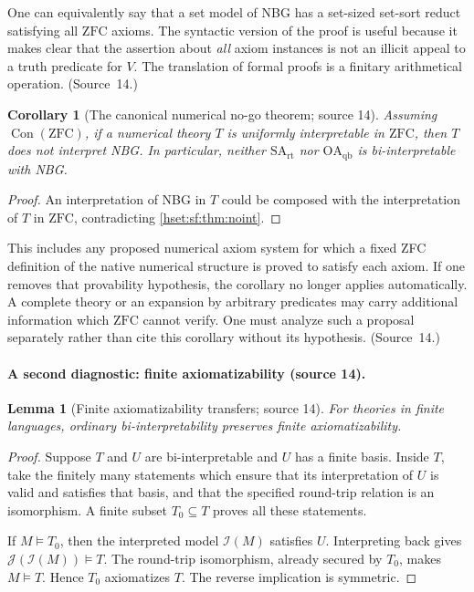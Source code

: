 \documentclass[11pt,letterpaper]{article}
\newtheorem{lemma}[lemma]{Lemma}\aliascntresetthe{lemma}
\newtheorem{corollary}[corollary]{Corollary}\aliascntresetthe{corollary}
\theoremstyle{definition}
\theoremstyle{remark}
\newcommand{\I}{\mathcal I}
\newcommand{\J}{\mathcal J}
\newcommand{\ZFC}{\mathrm{ZFC}}
\newcommand{\Con}{\operatorname{Con}}
\newcommand{\SArt}{\mathrm{SA}_{\mathrm{rt}}}
\newcommand{\OAqb}{\mathrm{OA}_{\mathrm{qb}}}
\begin{document}
One can equivalently say that a set model of NBG has a set-sized set-sort reduct
satisfying all $\ZFC$ axioms. The syntactic version of the proof is useful because
it makes clear that the assertion about \emph{all} axiom instances is not an illicit
appeal to a truth predicate for $V$. The translation of formal proofs is a
finitary arithmetical operation. (Source~14.)

\begin{corollary}[The canonical numerical no-go theorem; source 14]\label{hset:sf:cor:numericalnoint}
Assuming $\Con(\ZFC)$, if a numerical theory $T$ is uniformly interpretable in
$\ZFC$, then $T$ does not interpret NBG. In particular, neither $\SArt$ nor
$\OAqb$ is bi-interpretable with NBG.
\end{corollary}
\begin{proof}
An interpretation of NBG in $T$ could be composed with the interpretation of $T$ in
$\ZFC$, contradicting \cref{hset:sf:thm:noint}.
\end{proof}

This includes any proposed numerical axiom system for which a fixed ZFC definition
of the native numerical structure is proved to satisfy each axiom. If one removes
that provability hypothesis, the corollary no longer applies automatically. A
complete theory or an expansion by arbitrary predicates may carry additional
information which $\ZFC$ cannot verify. One must analyze such a proposal
separately rather than cite this corollary without its hypothesis. (Source~14.)

\paragraph{A second diagnostic: finite axiomatizability (source 14).}

\begin{lemma}[Finite axiomatizability transfers; source 14]\label{hset:sf:lem:finite}
For theories in finite languages, ordinary bi-interpretability preserves finite
axiomatizability.
\end{lemma}
\begin{proof}
Suppose $T$ and $U$ are bi-interpretable and $U$ has a finite basis. Inside $T$,
take the finitely many statements which ensure that its interpretation of $U$ is
valid and satisfies that basis, and that the specified round-trip relation is an
isomorphism. A finite subset $T_0\subseteq T$ proves all these statements.

If $M\models T_0$, then the interpreted model $\I(M)$ satisfies $U$. Interpreting
back gives $\J(\I(M))\models T$. The round-trip isomorphism, already secured by
$T_0$, makes $M\models T$. Hence $T_0$ axiomatizes $T$. The reverse implication is
symmetric.
\end{proof}
\end{document}

